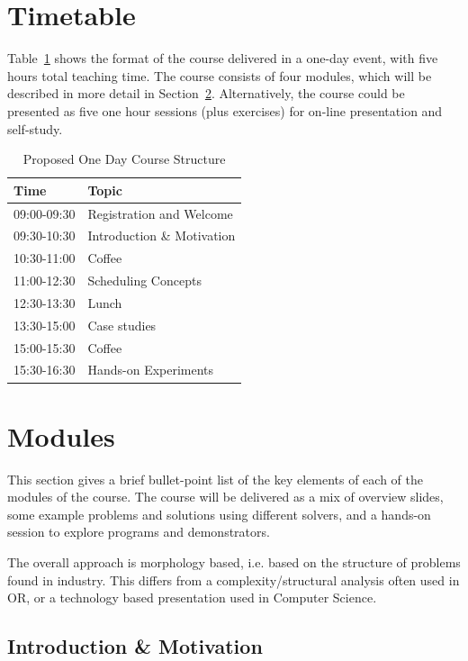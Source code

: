 \documentclass[a4paper]{article}
\begin{document}
\section{Timetable}
\label{sec:timetable}

Table~\ref{tab:timetable} shows the format of the course delivered in a one-day event, with five hours total teaching time. The course consists of four modules, which will be described in more detail in Section~\ref{sec:modules}. Alternatively, the course could be presented as five one hour sessions (plus exercises) for on-line presentation and self-study.

\begin{table}[htbp]
\caption{\label{tab:timetable}Proposed One Day Course Structure}
\centering
\begin{tabular}{lp{6cm}}\toprule
Time & Topic\\\midrule
09:00-09:30 & Registration and Welcome \\
09:30-10:30 & Introduction \& Motivation \\
10:30-11:00 & Coffee  \\
11:00-12:30 & Scheduling Concepts\\
12:30-13:30 & Lunch\\
13:30-15:00 & Case studies\\
15:00-15:30 & Coffee \\
15:30-16:30 & Hands-on Experiments\\
\bottomrule
\end{tabular}
\end{table} 

\section{Modules}
\label{sec:modules}

This section gives a brief bullet-point list of the key elements of each of the modules of the course. The course will be delivered as a mix of overview slides, some example problems and solutions using different solvers, and a hands-on session to explore programs and demonstrators. 

The overall approach is morphology based, i.e. based on the structure of problems found in industry. This differs from a complexity/structural analysis often used in OR, or a technology based presentation used in Computer Science. 

\subsection{Introduction \& Motivation}
\end{document}
